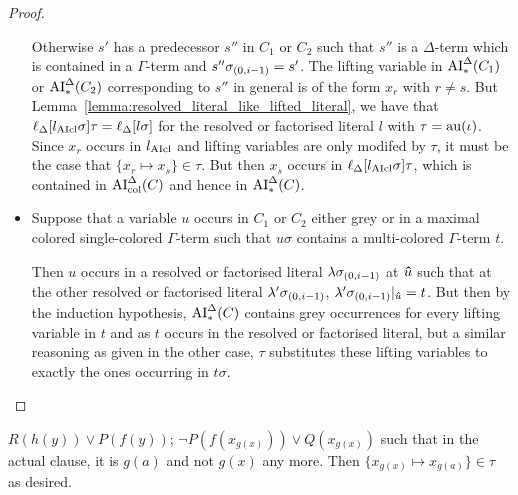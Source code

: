 \documentclass[,%
	draft=false,%
	numbers=noendperiod
	11pt,
	a4paper,
	oneside,%
	openany,
]{memoir}
\begin{document}
\begin{proof}
\begin{itemize}
			Otherwise $s'$ has a predecessor $s''$ in $C_1$ or $C_2$ such that $s''$ is a $\Delta$-term which is contained in a $\Gamma$-term and $s''\sigma_{(0,i-1)} = s'$.
			The lifting variable in $\operatorname{AI}_\mathrm{*}^\Delta(C_1)$ or $\operatorname{AI}_\mathrm{*}^\Delta(C_2)$ corresponding to $s''$ in general is of the form $x_r$ with $r\neq s$.
			But Lemma~\ref{lemma:resolved_literal_like_lifted_literal}, we have that $\ell_{\Delta}[l_{\operatorname{AIcl}}\sigma]\tau = \ell_{\Delta}[l\sigma]$ for the resolved or factorised literal $l$ with $\tau = \operatorname{au}(\iota)$.
			Since $x_r$ occurs in $l_{\operatorname{AIcl}}$ and lifting variables are only modifed by $\tau$, it must be the case that $\{x_r \mapsto x_s\}\in \tau$.
			But then $x_s$ occurs in $\ell_{\Delta}[l_{\operatorname{AIcl}}\sigma]\tau$, which is contained in $\operatorname{AI}_\mathrm{col}^\Delta(C)$ and hence in $\operatorname{AI}_\mathrm{*}^\Delta(C)$.


		\item
			Suppose that a variable $u$ occurs in $C_1$ or $C_2$ either grey or in a maximal colored single-colored $\Gamma$-term such that $u\sigma$ contains a multi-colored $\Gamma$-term $t$.

			Then $u$ occurs in a resolved or factorised literal $\lambda\sigma_{(0,i-1)}$ at $\bm\hat u$ such that at the other resolved or factorised literal $\lambda'\sigma_{(0,i-1)}$, $\lambda'\sigma_{(0,i-1)}|_{\bm\hat u} = t$.
			But then by the induction hypothesis, $\operatorname{AI}_\mathrm{*}^\Delta(C)$ contains grey occurrences for every lifting variable in $t$ and as $t$ occurs in the resolved or factorised literal, but a similar reasoning as given in the other case, $\tau$ substitutes these lifting variables to exactly the ones occurring in $t\sigma$.
			\qedhere
	\end{itemize}


\end{proof}

\begin{exa}
	$ R(h(y)) \lor P(f(y))$;
	$ \lnot P(f(x_{g(x)})) \lor Q(x_{g(x)}) $ such that in the actual clause, it is $g(a)$ and not $g(x)$ any more.
	Then $ \{ x_{g(x)} \mapsto x_{g(a)} \} \in \tau $ as desired.
\end{exa}
\end{document}
